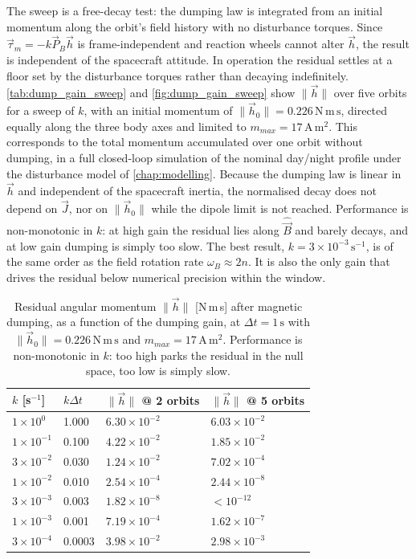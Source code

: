 The sweep is a free-decay test: the dumping law is integrated from an initial momentum along the orbit's field history with no disturbance torques. Since $\vec{\tau}_m = -k\vec{P}_B\vec{h}$ is frame-independent and reaction wheels cannot alter $\vec{h}$, the result is independent of the spacecraft attitude. In operation the residual settles at a floor set by the disturbance torques rather than decaying indefinitely. \autoref{tab:dump_gain_sweep} and \autoref{fig:dump_gain_sweep} show $\|\vec{h}\|$ over five orbits for a sweep of $k$, with an initial momentum of $\|\vec{h}_0\| = 0.226\,\mathrm{N\,m\,s}$, directed equally along the three body axes and limited to $m_{max} = 17\,\mathrm{A\,m^2}$. This corresponds to the total momentum accumulated over one orbit without dumping, in a full closed-loop simulation of the nominal day/night profile under the disturbance model of \autoref{chap:modelling}. Because the dumping law is linear in $\vec{h}$ and independent of the spacecraft inertia, the normalised decay does not depend on $\vec{J}$, nor on $\|\vec{h}_0\|$ while the dipole limit is not reached. Performance is non-monotonic in $k$: at high gain the residual lies along $\hat{\vec{B}}$ and barely decays, and at low gain dumping is simply too slow. The best result, $k = 3\times10^{-3}\,\mathrm{s^{-1}}$, is of the same order as the field rotation rate $\omega_B \approx 2n$. It is also the only gain that drives the residual below numerical precision within the window.

\begin{table}[h]
\centering
\begin{tabular}{@{}l l l l@{}}
\hline
$k$ [s$^{-1}$] & $k\Delta t$ & $\|\vec{h}\|$ @ 2 orbits & $\|\vec{h}\|$ @ 5 orbits \\
\hline
$1\times10^{0}$  & 1.000 & $6.30\times10^{-2}$ & $6.03\times10^{-2}$ \\
$1\times10^{-1}$ & 0.100 & $4.22\times10^{-2}$ & $1.85\times10^{-2}$ \\
$3\times10^{-2}$ & 0.030 & $1.24\times10^{-2}$ & $7.02\times10^{-4}$ \\
$1\times10^{-2}$ & 0.010 & $2.54\times10^{-4}$ & $2.44\times10^{-8}$ \\
$3\times10^{-3}$ & 0.003 & $1.82\times10^{-8}$ & $<10^{-12}$ \\
$1\times10^{-3}$ & 0.001 & $7.19\times10^{-4}$ & $1.62\times10^{-7}$ \\
$3\times10^{-4}$ & 0.0003 & $3.98\times10^{-2}$ & $2.98\times10^{-3}$ \\
\hline
\end{tabular}
\caption{Residual angular momentum $\|\vec{h}\|$ [N\,m\,s] after magnetic dumping, as a function of the dumping gain, at $\Delta t = 1\,\mathrm{s}$ with $\|\vec{h}_0\| = 0.226\,\mathrm{N\,m\,s}$ and $m_{max} = 17\,\mathrm{A\,m^2}$. Performance is non-monotonic in $k$: too high parks the residual in the null space, too low is simply slow.}
\label{tab:dump_gain_sweep}
\end{table}

